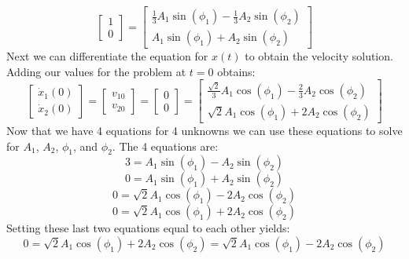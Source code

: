 \documentclass[12pt,letter]{article}
\begin{document}
\begin{example}
	\begin{equation}
		 \begin{bmatrix} 1 \\  0 \end{bmatrix} =  \begin{bmatrix} \frac{1}{3}A_1 \sin (\phi_1 ) -\frac{1}{3}A_2 \sin (\phi_2)\\ A_1 \sin (\phi_1 )+A_2 \sin (\phi_2 )\end{bmatrix}
	\end{equation}
	Next we can differentiate the equation for $x(t)$ to obtain the velocity solution. Adding our values for the problem at $t=0$ obtains:
	\begin{equation}
		 \begin{bmatrix} \dot{x}_1(0) \\  \dot{x}_2(0) \end{bmatrix}  = \begin{bmatrix} v_{10} \\  v_{20} \end{bmatrix} = \begin{bmatrix} 0 \\  0 \end{bmatrix} =   \begin{bmatrix} \frac{\sqrt{2}}{3}A_1 \cos (\phi_1 ) -\frac{2}{3}A_2 \cos (\phi_2)\\ \sqrt{2}A_1 \cos (\phi_1 )+2 A_2 \cos (\phi_2 )\end{bmatrix}
	\end{equation}
	Now that we have 4 equations for 4 unknowns we can use these equations to solve for $A_1$,  $A_2$, $\phi_1$,  and $\phi_2$. The 4 equations are:
	\begin{equation}
	3= A_1 \sin (\phi_1 ) - A_2 \sin (\phi_2)
	\end{equation}
	\begin{equation}
	0= A_1 \sin (\phi_1 ) + A_2 \sin (\phi_2)
	\end{equation}
	\begin{equation}
	0= \sqrt{2}A_1 \cos (\phi_1 ) - 2A_2 \cos (\phi_2)
	\end{equation}
	\begin{equation}
	0= \sqrt{2}A_1 \cos (\phi_1 ) + 2A_2 \cos (\phi_2)
	\end{equation}
	Setting these last two equations equal to each other yields:
	\begin{equation}
	0= \sqrt{2}A_1 \cos (\phi_1 ) + 2A_2 \cos (\phi_2) = \sqrt{2}A_1 \cos (\phi_1 ) - 2A_2 \cos (\phi_2)
	\end{equation}

\end{example}
\end{document}
